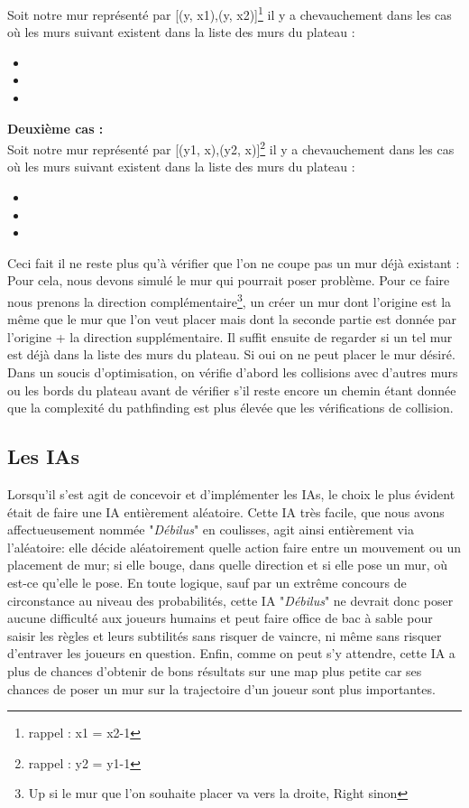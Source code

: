 \documentclass[a4paper, 12pt]{article}
\begin{document}
 Soit notre mur représenté par [(y, x1),(y, x2)]\footnote{rappel : x1 = x2-1} il y a chevauchement dans les cas où les murs suivant existent dans la liste des murs du plateau :
\begin{itemize}
\item[•] [(y, x1),(y, x2)]
\item[•] [(y, x1-1),(y, x1)]
\item[•] [(y, x2),(y, x2+1)]
\end{itemize}
\textbf{Deuxième cas :} \\
 Soit notre mur représenté par [(y1, x),(y2, x)]\footnote{rappel : y2 = y1-1} il y a chevauchement dans les cas où les murs suivant existent dans la liste des murs du plateau :
\begin{itemize}
\item[•] [(y1, x),(y2, x)]
\item[•] [(y1+1, x),(y1, x)]
\item[•] [(y2, x),(y2-1, x)]
\end{itemize}
Ceci fait il ne reste plus qu'à vérifier que l'on ne coupe pas un mur déjà existant : \\
Pour cela, nous devons simulé le mur qui pourrait poser problème. Pour ce faire nous prenons la direction complémentaire\footnote{Up si le mur que l'on souhaite placer va vers la droite, Right sinon}, un créer un mur dont l'origine est la même que le mur que l'on veut placer mais dont la seconde partie est donnée par l'origine + la direction supplémentaire. Il suffit ensuite de regarder si un tel mur est déjà dans la liste des murs du plateau. Si oui on ne peut placer le mur désiré. \\

Dans un soucis d'optimisation, on vérifie d'abord les collisions avec d'autres murs ou les bords du plateau avant de vérifier s'il reste encore un chemin étant donnée que la complexité du pathfinding est plus élevée que les vérifications de collision.

\subsection{Les IAs}
Lorsqu'il s'est agit de concevoir et d'implémenter les IAs, le choix le plus évident était de faire une IA entièrement aléatoire. Cette IA très facile, que nous avons affectueusement nommée "\textit{Débilus}" en coulisses, agit ainsi entièrement via l'aléatoire: elle décide aléatoirement quelle action faire entre un mouvement ou un placement de mur; si elle bouge, dans quelle direction et si elle pose un mur, où est-ce qu'elle le pose.
En toute logique, sauf par un extrême concours de circonstance au niveau des probabilités, cette IA "\textit{Débilus}" ne devrait donc poser aucune difficulté aux joueurs humains et peut faire office de bac à sable pour saisir les règles et leurs subtilités sans risquer de vaincre, ni même sans risquer d'entraver les joueurs en question. Enfin, comme on peut s'y attendre, cette IA a plus de chances d'obtenir de bons résultats sur une map plus petite car ses chances de poser un mur sur la trajectoire d'un joueur sont plus importantes.
\end{document}
